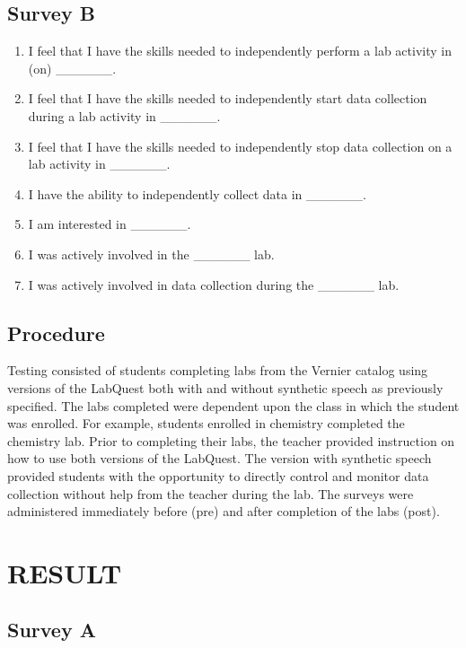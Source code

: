 \documentclass[11.5pt]{sig-alternate} %
\begin{document}
\begin{large}
\subsection*{Survey B}
\begin{enumerate}
    \item  I feel that I have the skills needed to independently perform a lab activity in (on) \_\_\_\_\_\_.
    \item  I feel that I have the skills needed to independently start data collection during a lab activity in \_\_\_\_\_\_.
    \item  I feel that I have the skills needed to independently stop data collection on a lab activity in \_\_\_\_\_\_.
    \item I have the ability to independently collect data in \_\_\_\_\_\_.
    \item  I am interested in \_\_\_\_\_\_.
    \item  I was actively involved in the \_\_\_\_\_\_ lab.
    \item  I was actively involved in data collection during the \_\_\_\_\_\_ lab.
\end{enumerate}

\subsection*{Procedure} 

Testing consisted of students completing labs from the Vernier catalog using versions of the LabQuest both with and without synthetic speech as previously specified. The labs completed were dependent upon the class in which the student was enrolled. For example, students enrolled in chemistry completed the chemistry lab. Prior to completing their labs, the teacher provided instruction on how to use both versions of the LabQuest. The version with synthetic speech provided students with the opportunity to directly control and monitor data collection without help from the teacher during the lab. The surveys were administered immediately before (pre) and after completion of the labs (post). 
      
\section*{RESULT}
 
\subsection*{Survey A}


\end{large}
\end{document}
